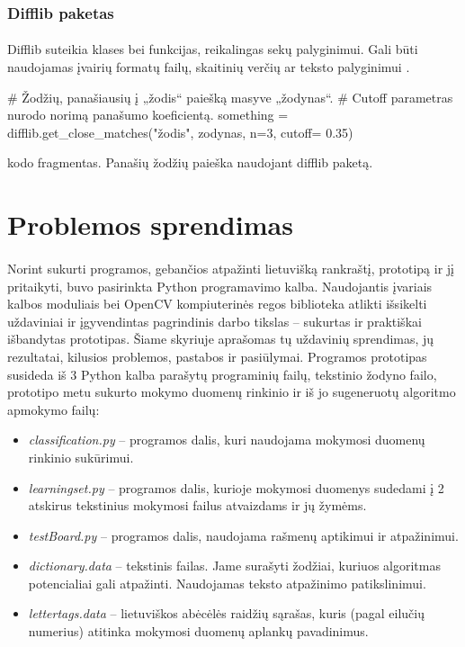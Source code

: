 \documentclass[a4paper,12pt]{article}
\begin{document}
\subsubsection{Difflib paketas}
\paragraph{} Difflib suteikia klases bei funkcijas, reikalingas sekų palyginimui. Gali būti naudojamas įvairių formatų failų, skaitinių verčių ar teksto palyginimui \cite{DIFFLIB}.
	\begin{listing}[H]
		\begin{pythoncode}
# Žodžių, panašiausių į „žodis“ paiešką masyve „žodynas“. 
# Cutoff parametras nurodo norimą panašumo koeficientą.
something = difflib.get_close_matches("žodis", zodynas, n=3, cutoff= 0.35) 
		\end{pythoncode}
		\caption{kodo fragmentas. Panašių žodžių paieška naudojant difflib paketą.}	
	\end{listing}

\clearpage
\section{Problemos sprendimas}

\paragraph{} Norint sukurti programos, gebančios atpažinti lietuvišką rankraštį, prototipą ir jį pritaikyti, buvo pasirinkta Python programavimo kalba. Naudojantis įvariais kalbos moduliais bei OpenCV kompiuterinės regos biblioteka atlikti išsikelti uždaviniai ir įgyvendintas pagrindinis darbo tikslas – sukurtas ir praktiškai išbandytas prototipas. Šiame skyriuje aprašomas tų uždavinių sprendimas, jų rezultatai, kilusios problemos, pastabos ir pasiūlymai.
Programos prototipas susideda iš 3 Python kalba parašytų programinių failų, tekstinio žodyno failo, prototipo metu sukurto mokymo duomenų rinkinio ir iš jo sugeneruotų algoritmo apmokymo failų:
\begin{itemize}
	\item \textit{classification.py} – programos dalis, kuri naudojama mokymosi duomenų rinkinio sukūrimui.
	\item \textit{learningset.py} – programos dalis, kurioje mokymosi duomenys sudedami į 2 atskirus tekstinius mokymosi failus atvaizdams ir jų žymėms.
	\item \textit{testBoard.py} – programos dalis, naudojama rašmenų aptikimui ir atpažinimui.
	\item \textit{dictionary.data} – tekstinis failas. Jame surašyti žodžiai, kuriuos algoritmas potencialiai gali atpažinti. Naudojamas teksto atpažinimo patikslinimui.
	\item \textit{lettertags.data} – lietuviškos abėcėlės raidžių sąrašas, kuris (pagal eilučių numerius) atitinka mokymosi duomenų aplankų pavadinimus.
\end{itemize}	
\end{document}
